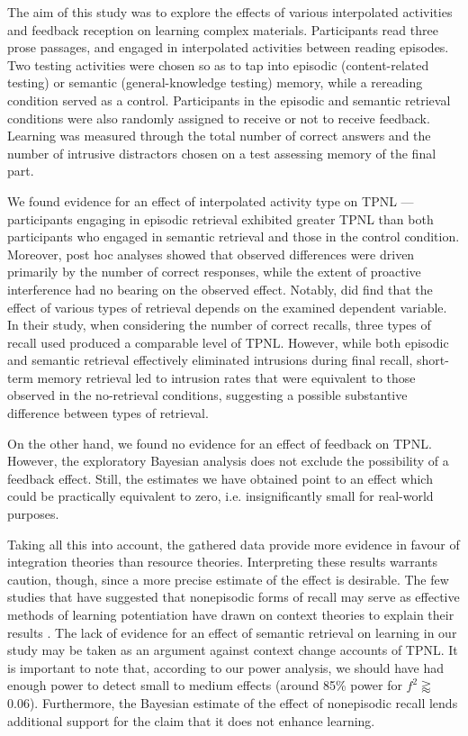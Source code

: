 \documentclass[../main.tex]{subfiles}
\begin{document}
	
The aim of this study was to explore the effects of various interpolated activities
and feedback reception on learning complex materials. Participants read three prose
passages, and engaged in interpolated activities between reading episodes. Two 
testing activities were chosen so as to tap into episodic (content-related testing) 
or semantic (general-knowledge testing) memory, while a rereading condition served 
as a control. Participants in the episodic and semantic retrieval conditions were 
also randomly assigned to receive or not to receive feedback. Learning was measured 
through the total number of correct answers and the number of intrusive distractors 
chosen on a test assessing memory of the final part.

We found evidence for an effect of interpolated activity type on TPNL --- participants 
engaging in episodic retrieval exhibited greater TPNL than both participants who engaged in 
semantic retrieval and those in the control condition. Moreover, post hoc analyses
showed that observed differences were driven primarily by the number of correct
responses, while the extent of proactive interference had no bearing on the observed
effect. Notably, \cite{pastotterRetrievalLearningFacilitates2011} did find that the 
effect of various types of retrieval depends on the examined dependent variable. 
In their study, when considering the number of correct recalls, three types of recall 
used produced a comparable level of TPNL. However, while both episodic and semantic
retrieval effectively eliminated intrusions during final recall, short-term memory
retrieval led to intrusion rates that were equivalent to those observed in the 
no-retrieval conditions, suggesting a possible substantive difference between types 
of retrieval.

On the other hand, we found no evidence for an effect of feedback on TPNL. However, 
the exploratory Bayesian analysis does not exclude the possibility of a feedback effect. 
Still, the estimates we have obtained point to an effect which could be practically 
equivalent to zero, i.e. insignificantly small for real-world purposes.

Taking all this into account, the gathered data provide more evidence in
favour of integration theories than resource theories. Interpreting these results
warrants caution, though, since a more precise estimate of the effect is desirable.
The few studies that have suggested that nonepisodic forms of recall may serve
as effective methods of learning potentiation have drawn on context theories to
explain their results \citep{divisRetrievalSpeedsContext2014, pastotterRetrievalLearningFacilitates2011}.
The lack of evidence for an effect of semantic retrieval on learning
in our study may be taken as an argument against context change accounts of
TPNL. It is important to note that, according to our power analysis, we should
have had enough power to detect small to medium effects (around 85\% power for
\(f^2 \gtrapprox\) 0.06). Furthermore, the Bayesian estimate of the effect of
nonepisodic recall lends additional support for the claim that it does not
enhance learning.
\end{document}
